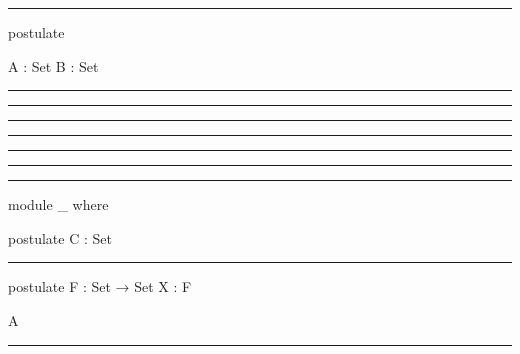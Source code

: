 \documentclass{article}
\begin{document}
\hrule
\begin{code}
postulate
  
  A : Set  
  B : Set  
\end{code}
\hrule
\begin{code}
  
\end{code}
\hrule
\begin{code}

\end{code}
\hrule
\begin{code}
\end{code}
\hrule
\begin{code}  
  \end{code}
\hrule
  \begin{code}  
\end{code}
\hrule
  \begin{code}  
    \end{code}
\hrule
\begin{code}
module _ where
\end{code}
\begin{code}
  
  postulate
    C : Set
\end{code}
\hrule
\begin{AgdaAlign}
\begin{code}
postulate
  F  : Set → Set
  X  : F  
\end{code}
\begin{code}
          A
\end{code}
\end{AgdaAlign}
\hrule
\end{document}
